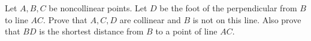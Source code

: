 Let $A,B,C$ be noncollinear points. Let $D$ be the foot of the perpendicular from $B$ to line $AC$. Prove that $A,C,D$ are collinear and $B$ is not on this line. Also prove that $BD$ is the shortest distance from $B$ to a point of line $AC$.

